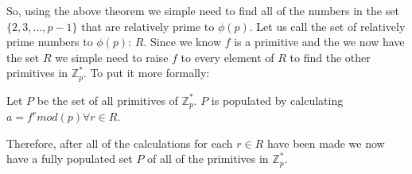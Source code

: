 \documentclass[12pt, letterpaper]{article}
\begin{document}
So, using the above theorem we simple need to find all of the numbers in the set $\{2, 3, ... , p-1\}$ that are relatively prime to $\phi(p)$. Let us call the set of relatively prime numbers to $\phi(p)$: $R$. Since we know $f$ is a primitive and the we now have the set $R$ we simple need to raise $f$ to every element of $R$ to find the other primitives in $\mathbb{Z}_p^*$. To put it more formally:

\begin{center}
	Let $P$ be the set of all primitives of $\mathbb{Z}_p^*$. $P$ is populated by calculating $a = f^r mod(p) \forall r \in R$.
\end{center}

Therefore, after all of the calculations for each $r \in R$ have been made we now have a fully populated set $P$ of all of the primitives in $\mathbb{Z}_p^*$.
\end{document}
